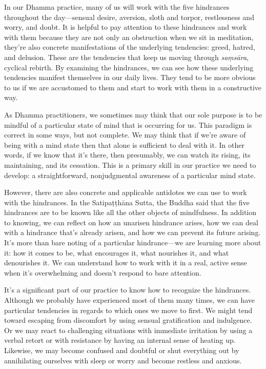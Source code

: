 
In our Dhamma practice, many of us will work with the five hindrances 
throughout the day---sensual desire, aversion, sloth and torpor, 
restlessness and worry, and doubt. It is helpful to pay attention to 
these hindrances and work with them because they are not only an 
obstruction when we sit in meditation, they're also concrete 
manifestations of the underlying tendencies: greed, hatred, and 
delusion. These are the tendencies that keep us moving through 
\emph{saṃsāra}, cyclical rebirth. By examining the hindrances, we 
can see how these underlying tendencies manifest themselves in our 
daily lives. They tend to be more obvious to us if we are accustomed to 
them and start to work with them in a constructive way.

As Dhamma practitioners, we sometimes may think that our sole purpose 
is to be mindful of a particular state of mind that is occurring for 
us. This paradigm is correct in some ways, but not complete. We may 
think that if we're aware of being with a mind state then that alone is 
sufficient to deal with it. In other words, if we know that it's there, 
then presumably, we can watch its rising, its maintaining, and its 
cessation. This is a primary skill in our practice we need to develop: 
a straightforward, nonjudgmental awareness of a particular mind state.

However, there are also concrete and applicable antidotes we can use to 
work with the hindrances. In the Satipaṭṭhāna Sutta, the Buddha 
said that the five hindrances are to be known like all the other 
objects of mindfulness. In addition to knowing, we can reflect on how 
an unarisen hindrance arises, how we can deal with a hindrance that's 
already arisen, and how we can prevent its future arising. It's more 
than bare noting of a particular hindrance---we are learning more about 
it: how it comes to be, what encourages it, what nourishes it, and what 
denourishes it. We can understand how to work with it in a real, active 
sense when it's overwhelming and doesn't respond to bare attention.

It's a significant part of our practice to know how to recognize the 
hindrances. Although we probably have experienced most of them many 
times, we can have particular tendencies in regards to which ones we 
move to first. We might tend toward escaping from discomfort by using 
sensual gratification and indulgence. Or we may react to challenging 
situations with immediate irritation by using a verbal retort or with 
resistance by having an internal sense of heating up. Likewise, we may 
become confused and doubtful or shut everything out by annihilating 
ourselves with sleep or worry and become restless and anxious.

